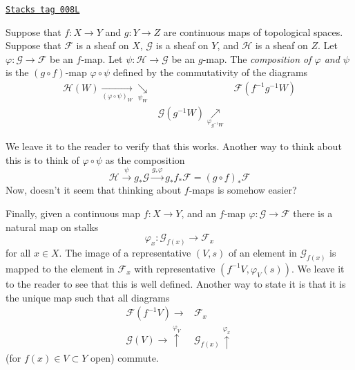 \begin{definition}
\label{sheaves-definition-composition-f-maps}
\href{https://stacks.math.columbia.edu/tag/008L}{\texttt{Stacks tag 008L}}

Suppose that $f : X \to Y$ and $g : Y \to Z$ are continuous
maps of topological spaces. Suppose that $\mathcal{F}$ is
a sheaf on $X$, $\mathcal{G}$ is a sheaf on $Y$, and
$\mathcal{H}$ is a sheaf on $Z$.
Let $\varphi : \mathcal{G} \to \mathcal{F}$ be an $f$-map.
Let $\psi : \mathcal{H} \to \mathcal{G}$ be an $g$-map.
The {\it composition of $\varphi$ and $\psi$} is the
$(g \circ f)$-map $\varphi \circ \psi$ defined
by the commutativity of the diagrams
$$
\begin{array}{ccc}\mathcal{H}(W) \underset{(\varphi \circ \psi)_W}{\longrightarrow}\underset{\psi_W}{\searrow} &  & \mathcal{F}(f^{-1}g^{-1}W) \\  & \mathcal{G}(g^{-1}W)
\underset{\varphi_{g^{-1}W}}{\nearrow} & \end{array}
$$
\end{definition}

We leave it to the reader to verify that this works.
Another way to think about this is to think of
$\varphi \circ \psi$ as the composition
$$
\mathcal{H}
\xrightarrow{\psi}
g_*\mathcal{G}
\xrightarrow{g_*\varphi}
g_* f_* \mathcal{F} = (g \circ f)_* \mathcal{F}
$$
Now, doesn't it seem that thinking about $f$-maps is somehow
easier?

\medskip\noindent
Finally, given a continuous map $f : X \to Y$, and an
$f$-map $\varphi : \mathcal{G} \to \mathcal{F}$ there is
a natural map on stalks
$$
\varphi_x : \mathcal{G}_{f(x)} \longrightarrow \mathcal{F}_x
$$
for all $x \in X$. The image of a representative $(V, s)$
of an element in $\mathcal{G}_{f(x)}$ is mapped to the
element in $\mathcal{F}_x$ with representative $(f^{-1}V,
\varphi_V(s))$. We leave it to the reader to see that this
is well defined. Another way to state it is that it is the
unique map such that all diagrams
$$
\begin{array}{cc}\mathcal{F}(f^{-1}V) \longrightarrow & \mathcal{F}_x \\ \mathcal{G}(V) \longrightarrow\overset{\varphi_V}{\uparrow} & \mathcal{G}_{f(x)} \overset{\varphi_x}{\uparrow}\end{array}
$$
(for $f(x) \in V \subset Y$ open) commute.

